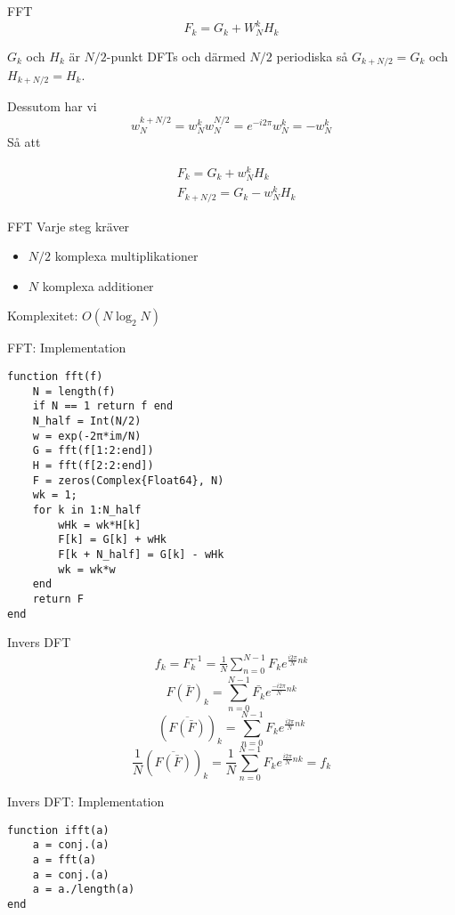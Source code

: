 \documentclass[presentation]{beamer}
\begin{document}
\begin{frame}[label={sec:orge0eb200}]{FFT}
\[ F_{k} = G_{k} + W_{N}^{k}H_{k} \]

\(G_{k}\) och \(H_{k}\) är \(N/2\)-punkt DFTs och därmed \(N/2\) periodiska så
\(G_{k + N/2} = G_{k}\) och \(H_{k + N/2} = H_{k}\).

Dessutom har vi
\[ w_{N}^{k + N/2} = w_{N}^{k}w_{N}^{N/2} = e^{-i2 \pi}w_{N}^{k} = -w_{N}^{k} \]
Så att  

\begin{align*}
&F_{k} = G_{k} + w_{N}^{k}H_{k} \\
&F_{k + N/2} = G_{k} - w_{N}^{k}H_{k}
\end{align*}
\end{frame}

\begin{frame}[label={sec:org6a95157}]{FFT}
Varje steg kräver
\begin{itemize}
\item \(N/2\) komplexa multiplikationer
\item \(N\) komplexa additioner
\end{itemize}

Komplexitet: \(O(N \log_2{N})\)
\end{frame}

\begin{frame}[label={sec:orgfe1a6ce},fragile]{FFT: Implementation}
 \begin{verbatim}
function fft(f)
    N = length(f)
    if N == 1 return f end
    N_half = Int(N/2)
    w = exp(-2π*im/N)
    G = fft(f[1:2:end])
    H = fft(f[2:2:end])
    F = zeros(Complex{Float64}, N)
    wk = 1;
    for k in 1:N_half
        wHk = wk*H[k]
        F[k] = G[k] + wHk
        F[k + N_half] = G[k] - wHk
        wk = wk*w
    end
    return F
end
\end{verbatim}
\end{frame}

\begin{frame}[label={sec:org25aeed5}]{Invers DFT}
\begin{align*}
f_{k} = F_{k}^{-1} = \frac{1}{N}\sum_{n=0}^{N-1}F_{k}e^{\frac{i2 \pi}{N}nk}
\end{align*}
\pause
\begin{equation*}
  F(\bar{F})_{k} = \sum_{n=0}^{N-1}\bar{F_{k}}e^{\frac{-i2 \pi}{N}nk}
\end{equation*}
\pause
\begin{equation*}
  (\overline{F(\bar{F})})_{k} = \sum_{n=0}^{N-1}F_{k}e^{\frac{i2 \pi}{N}nk}
\end{equation*}
\pause
\begin{equation*}
    \frac{1}{N}(\overline{F(\bar{F})})_{k} =
  \frac{1}{N}\sum_{n=0}^{N-1}F_{k}e^{\frac{i2 \pi}{N}nk} = f_{k}
\end{equation*}

\newpage
\end{frame}

\begin{frame}[label={sec:org2fed8f4},fragile]{Invers DFT: Implementation}
 \begin{verbatim}
function ifft(a)
    a = conj.(a)
    a = fft(a)
    a = conj.(a)
    a = a./length(a)
end
\end{verbatim}
\end{frame}
\end{document}
